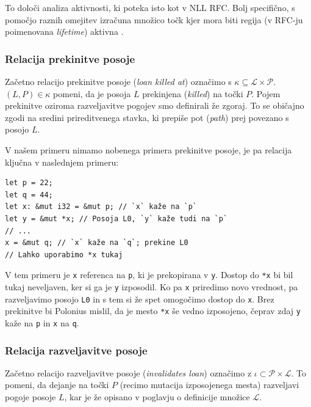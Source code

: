 \documentclass[a4paper,12pt,openright]{book}
\begin{document}
To določi analiza aktivnosti, ki poteka isto kot v NLL RFC. Bolj specifično, s pomočjo raznih omejitev izračuna množico točk
kjer mora biti regija (v RFC-ju poimenovana \textit{lifetime}) aktivna \cite{2094nllRustRFC}.

\subsubsection{Relacija prekinitve posoje}

Začetno relacijo prekinitve posoje (\textit{loan killed at}) označimo s $\kappa \subseteq \mathcal{L} \times \mathcal{P}$.
$(L,P) \in \kappa$ pomeni, da je posoja $L$ prekinjena (\textit{killed}) na točki $P$. Pojem prekinitve oziroma razveljavitve
pogojev smo definirali že zgoraj. To se običajno zgodi na sredini prireditvenega stavka, ki prepiše pot (\textit{path}) prej povezano s posojo $L$.

V našem primeru nimamo nobenega primera prekinitve posoje, je pa relacija ključna v naslednjem primeru:

\begin{listing}[!ht]
	\begin{verbatim}
let p = 22;
let q = 44;
let x: &mut i32 = &mut p; // `x` kaže na `p`
let y = &mut *x; // Posoja L0, `y` kaže tudi na `p`
// ...
x = &mut q; // `x` kaže na `q`; prekine L0
// Lahko uporabimo *x tukaj
\end{verbatim}
	\caption{Primer prekinitve posoje}
	\label{listing:loanKilled}
\end{listing}

V tem primeru je \verb|x| referenca na \verb|p|, ki je prekopirana v \verb|y|. Dostop do \verb|*x| bi bil tukaj neveljaven,
ker si ga je \verb|y| izposodil. Ko pa \verb|x| priredimo novo vrednost, pa razveljavimo posojo \verb|L0| in s tem si že spet
omogočimo dostop do \verb|x|. Brez prekinitve bi Polonius mislil, da je mesto \verb|*x| še vedno izposojeno, čeprav
zdaj \verb|y| kaže na \verb|p| in \verb|x| na \verb|q|.

\subsubsection{Relacija razveljavitve posoje}

Začetno relacijo razveljavitve posoje (\textit{invalidates loan}) označimo z $\iota \subset \mathcal{P} \times \mathcal{L}$.
To pomeni, da dejanje na točki $P$ (recimo mutacija izposojenega mesta) razveljavi pogoje posoje $L$, kar
je že opisano v poglavju o definicije množice $\mathcal{L}$.
\end{document}
